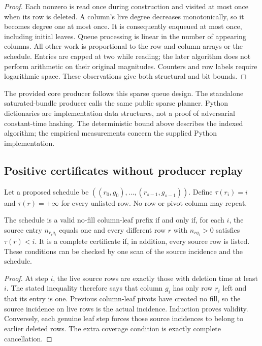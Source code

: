 \begin{proof}
Each nonzero is read once during construction and visited at most once
when its row is deleted. A column's live degree decreases monotonically,
so it becomes degree one at most once. It is consequently enqueued at
most once, including initial leaves. Queue processing is linear in the
number of appearing columns. All other work is proportional to the row
and column arrays or the schedule. Entries are capped at two while reading;
the later algorithm does not perform arithmetic on their original magnitudes.
Counters and row labels require logarithmic space. These observations give
both structural and bit bounds.
\end{proof}

The provided core producer follows this sparse queue design. The standalone
saturated-bundle producer calls the same public sparse planner. Python dictionaries
are implementation data structures, not a proof of adversarial constant-time
hashing. The deterministic bound above describes the indexed algorithm;
the empirical measurements concern the supplied Python implementation.

\subsection{Positive certificates without producer replay}

Let a proposed schedule be
$((r_0,g_0),\ldots,(r_{s-1},g_{s-1}))$. Define $\tau(r_i)=i$ and
$\tau(r)=+\infty$ for every unlisted row. No row or pivot column may repeat.

\begin{theorem}\label{thm:timestamp}
The schedule is a valid no-fill column-leaf prefix if and only if, for each
$i$, the source entry $n_{r_i g_i}$ equals one and every different row $r$
with $n_{rg_i}>0$ satisfies $\tau(r)<i$. It is a complete certificate if,
in addition, every source row is listed. These conditions can be checked
by one scan of the source incidence and the schedule.
\end{theorem}

\begin{proof}
At step $i$, the live source rows are exactly those with deletion time
at least $i$. The stated inequality therefore says that column $g_i$
has only row $r_i$ left and that its entry is one. Previous column-leaf
pivots have created no fill, so the source incidence on live rows is the
actual incidence. Induction proves validity. Conversely, each genuine
leaf step forces those source incidences to belong to earlier deleted
rows. The extra coverage condition is exactly complete cancellation.
\end{proof}

